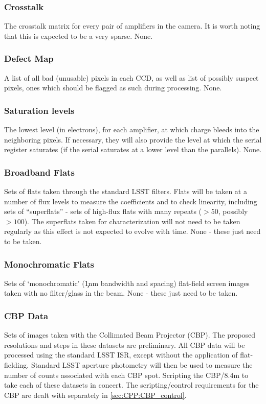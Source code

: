 \subsubsection{Crosstalk}\label{sec:CPP:inputs:crosstalk}
\cameraTeam
The crosstalk matrix for every pair of amplifiers in the camera. It is worth noting that this is expected to be a very sparse.
\alg None.


\subsubsection{Defect Map}\label{sec:CPP:inputs:defectList}
\cameraTeam
A list of all bad (unusable) pixels in each CCD, as well as list of possibly suspect pixels, \ie ones which should be flagged as such during processing.
\alg None.


\subsubsection{Saturation levels}\label{sec:CPP:inputs:saturationLevel}
\cameraTeam
The lowest level (in electrons), for each amplifier, at which charge bleeds into the neighboring pixels. If necessary, they will also provide the level at which the serial register saturates (\ie if the serial saturates at a lower level than the parallels).
\alg None.


\subsubsection{Broadband Flats}\label{sec:CPP:inputs:broadFlat}
Sets of flats taken through the standard LSST filters. Flats will be taken at a number of flux levels to measure the \bfeffect coefficients and to check linearity, including sets of ``superflats'' - sets of high-flux flats with many repeats ($>50$, possibly $>100$). The superflats taken for \bfeffect characterization will not need to be taken regularly as this effect is not expected to evolve with time.
\alg None - these just need to be taken.


\subsubsection{Monochromatic Flats}\label{sec:CPP:inputs:monoFlat}
Sets of `monochromatic' (\c 1nm bandwidth and spacing) flat-field screen images taken with no filter/glass in the beam.
\alg None - these just need to be taken.


\subsubsection{CBP Data}\label{sec:CPP:inputs:CBP}
Sets of images taken with the Collimated Beam Projector (CBP). The proposed resolutions and steps in these datasets are preliminary. All CBP data will be processed using the standard LSST ISR, except without the application of flat-fielding. Standard LSST aperture photometry will then be used to measure the number of counts associated with each CBP spot.
\alg Scripting the CBP/8.4m to take each of these datasets in concert. The scripting/control requirements for the CBP are dealt with separately in \secsymbol\ref{sec:CPP:CBP_control}.



